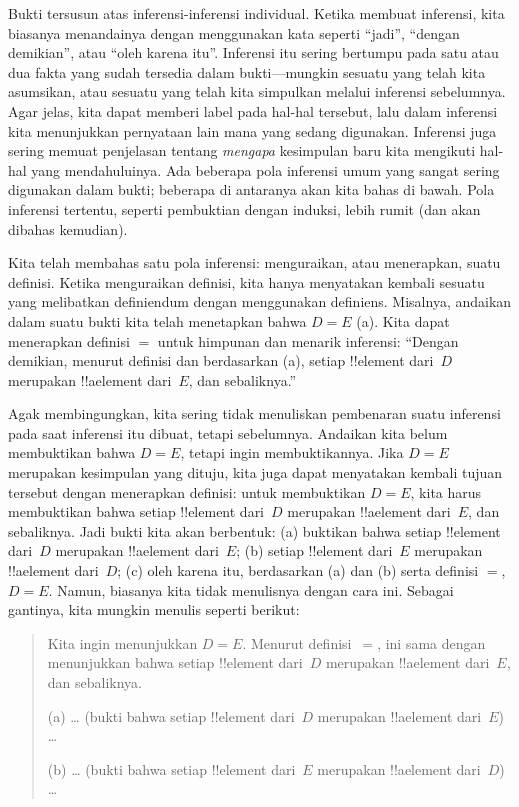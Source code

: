 \documentclass[../../../include/open-logic-section]{subfiles}
\begin{document}


Bukti tersusun atas inferensi-inferensi individual. Ketika membuat
inferensi, kita biasanya menandainya dengan menggunakan kata seperti
``jadi'', ``dengan demikian'', atau ``oleh karena itu''. Inferensi itu
sering bertumpu pada satu atau dua fakta yang sudah tersedia dalam
bukti---mungkin sesuatu yang telah kita asumsikan, atau sesuatu yang
telah kita simpulkan melalui inferensi sebelumnya. Agar jelas, kita
dapat memberi label pada hal-hal tersebut, lalu dalam inferensi kita
menunjukkan pernyataan lain mana yang sedang digunakan. Inferensi juga
sering memuat penjelasan tentang \emph{mengapa} kesimpulan baru kita
mengikuti hal-hal yang mendahuluinya. Ada beberapa pola inferensi umum
yang sangat sering digunakan dalam bukti; beberapa di antaranya akan
kita bahas di bawah. Pola inferensi tertentu, seperti pembuktian dengan
induksi, lebih rumit (dan akan dibahas kemudian).

Kita telah membahas satu pola inferensi: menguraikan, atau menerapkan,
suatu definisi. Ketika menguraikan definisi, kita hanya menyatakan
kembali sesuatu yang melibatkan definiendum dengan menggunakan
definiens. Misalnya, andaikan dalam suatu bukti kita telah menetapkan
bahwa $D = E$ (a). Kita dapat menerapkan definisi $=$ untuk himpunan dan
menarik inferensi: ``Dengan demikian, menurut definisi dan berdasarkan
(a), setiap !!{element} dari~$D$ merupakan !!a{element} dari~$E$, dan
sebaliknya.''

Agak membingungkan, kita sering tidak menuliskan pembenaran suatu
inferensi pada saat inferensi itu dibuat, tetapi sebelumnya. Andaikan
kita belum membuktikan bahwa $D = E$, tetapi ingin membuktikannya. Jika
$D = E$ merupakan kesimpulan yang dituju, kita juga dapat menyatakan
kembali tujuan tersebut dengan menerapkan definisi: untuk membuktikan
$D = E$, kita harus membuktikan bahwa setiap !!{element} dari~$D$
merupakan !!a{element} dari~$E$, dan sebaliknya. Jadi bukti kita akan
berbentuk: (a) buktikan bahwa setiap !!{element} dari~$D$ merupakan
!!a{element} dari~$E$; (b) setiap !!{element} dari~$E$ merupakan
!!a{element} dari~$D$; (c) oleh karena itu, berdasarkan (a) dan (b)
serta definisi $=$, $D = E$. Namun, biasanya kita tidak menulisnya
dengan cara ini. Sebagai gantinya, kita mungkin menulis seperti
berikut:
\begin{quote}
Kita ingin menunjukkan $D = E$. Menurut definisi~$=$, ini sama dengan
menunjukkan bahwa setiap !!{element} dari~$D$ merupakan !!a{element}
dari~$E$, dan sebaliknya.

(a) \dots{} (bukti bahwa setiap !!{element} dari~$D$ merupakan
!!a{element} dari~$E$) \dots

(b) \dots{} (bukti bahwa setiap !!{element} dari~$E$ merupakan
!!a{element} dari~$D$) \dots
\end{quote}
\end{document}
